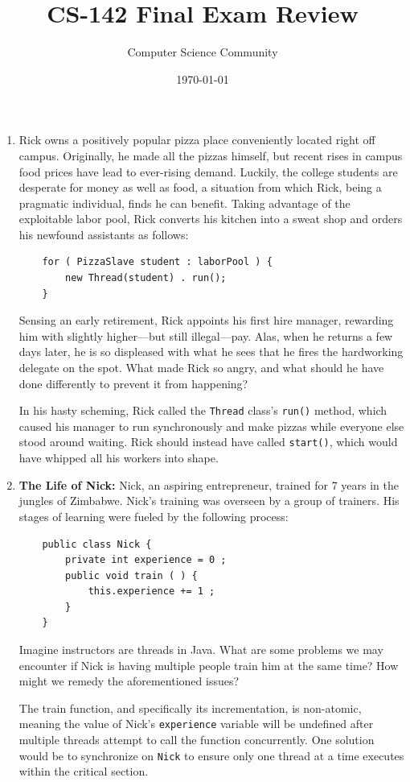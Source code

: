 \documentclass[11pt]{article}
\author{Computer Science Community}
\title{CS-142 Final Exam Review}
\date{\today}
\newenvironment{answer}{\large\lstset{basicstyle=\tiny\ttfamily}\color{white}}{}
\newenvironment{answer}{\large\lstset{basicstyle=\large\ttfamily}\color{red}}{}
\begin{document}
\header

\begin{enumerate}
\item Rick owns a positively popular pizza place conveniently located right off campus.
	Originally, he made all the pizzas himself, but recent rises in campus food prices have lead to ever-rising demand.
	Luckily, the college students are desperate for money as well as food, a situation from which Rick, being a pragmatic individual, finds he can benefit.
	Taking advantage of the exploitable labor pool, Rick converts his kitchen into a sweat shop and orders his newfound assistants as follows:
	\begin{lstlisting}
	for ( PizzaSlave student : laborPool ) {
		new Thread(student) . run();
	}
	\end{lstlisting}
	Sensing an early retirement, Rick appoints his first hire manager, rewarding him with slightly higher---but still illegal---pay.
	Alas, when he returns a few days later, he is so displeased with what he sees that he fires the hardworking delegate on the spot.
	What made Rick so angry, and what should he have done differently to prevent it from happening?

	\begin{answer}
	In his hasty scheming, Rick called the \texttt{Thread} class's \texttt{run()} method, which caused his manager to run synchronously and make pizzas while everyone else stood around waiting.
	Rick should instead have called \texttt{start()}, which would have whipped all his workers into shape.
	\end{answer}

\item {\bf The Life of Nick:} %
    Nick, an aspiring entrepreneur, trained for 7 years in the jungles of Zimbabwe.
    Nick's training was overseen by a group of trainers. His stages of learning were 
    fueled by the following process:\\
    \begin{verbatim}
    public class Nick {
        private int experience = 0 ;
        public void train ( ) {
            this.experience += 1 ;
        }
    }\end{verbatim}Imagine instructors are threads in Java. What are some problems
    we may encounter if Nick is having multiple people train him at the same time?
    How might we remedy the aforementioned issues?

    \begin{answer}
    The train function, and specifically its incrementation, is non-atomic, meaning the value of Nick's 
    \texttt{experience} variable will be undefined after multiple threads attempt to call the function concurrently.  One solution would be to synchronize on \texttt{Nick} to ensure only one thread at a time executes within the critical section.\\
    \end{answer}


\end{enumerate}
\end{document}
